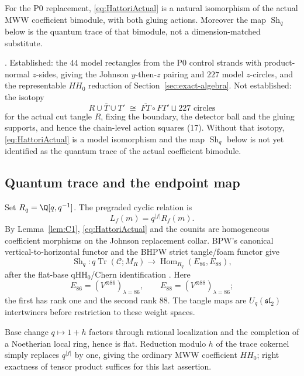 \begin{lemma}\label{lem:C1}
For the P0 replacement, \eqref{eq:HattoriActual} is a natural isomorphism of
the actual MWW coefficient bimodule, with both gluing actions.  Moreover the
map \(\operatorname{Sh}_q\) below is the quantum trace of that bimodule, not a
dimension-matched substitute.
\end{lemma}

\begin{remark}
\Open.  Established: the $44$ model rectangles from the P0 control strands
with product-normal $z$-sides, giving the Johnson $y$-then-$z$ pairing and
$227$ model $z$-circles, and the representable $HH_0$ reduction of
Section~\ref{sec:exact-algebra}.  Not established: the isotopy
\[
R\cup\overline T\cup T'\;\cong\;\overline{FT}\circ FT'\sqcup 227\text{ circles}
\]
for the actual cut tangle $R$, fixing the boundary, the detector ball and
the gluing supports, and hence the chain-level action squares (17).  Without
that isotopy, \eqref{eq:HattoriActual} is a model isomorphism and the map
$\operatorname{Sh}_q$ below is not yet identified as the quantum trace of
the actual coefficient bimodule.
\end{remark}

\subsection{Quantum trace and the endpoint map}

Set $R_q=\Q[q,q^{-1}]$.  The pregraded cyclic relation is
\[
L_f(m)=q^{|f|}R_f(m).
\]
By Lemma~\ref{lem:C1}, \eqref{eq:HattoriActual} and the counits are homogeneous
coefficient morphisms on the Johnson replacement collar.  BPW's canonical vertical-to-horizontal functor and the BHPW strict
tangle/foam functor give
\begin{equation}\label{eq:actualShadow}
\operatorname{Sh}_q:q\operatorname{Tr}(\mathcal C;M_R)
\longrightarrow\operatorname{Hom}_{R_q}(E_{86},E_{88}),
\end{equation}
after the flat-base qHH$_0$/Chern identification
\cite{BeliakovaPutyraWehrli2019,BeliakovaHogancampPutyraWehrli2023}.  Here
\[
E_{86}=(V^{\otimes86})_{\lambda=86},\qquad
E_{88}=(V^{\otimes88})_{\lambda=86};
\]
the first has rank one and the second rank 88.  The tangle maps are
$U_q(\mathfrak{sl}_2)$ intertwiners before restriction to these weight
spaces.

Base change $q\mapsto1+h$ factors through rational localization and the
completion of a Noetherian local ring, hence is flat.  Reduction modulo $h$
of the trace cokernel simply replaces $q^{|f|}$ by one, giving the ordinary
MWW coefficient $HH_0$; right exactness of tensor product suffices for this
last assertion.

